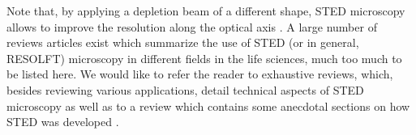 Note that, by applying a depletion beam of a
different shape, STED microscopy allows to improve the resolution along the
optical axis \cite{Harke2008, Wildanger2009}. A large number of reviews articles exist
which summarize the use of STED (or in general, RESOLFT) microscopy in different
fields in the life sciences, much too much to be listed here. We would like to
refer the reader to exhaustive reviews, which, besides
reviewing various applications, detail technical aspects of STED microscopy
\cite{Turkowyd2016,Blom2017} as well as to a review which contains some
anecdotal sections on how STED was developed \cite{Sahl2019}.

